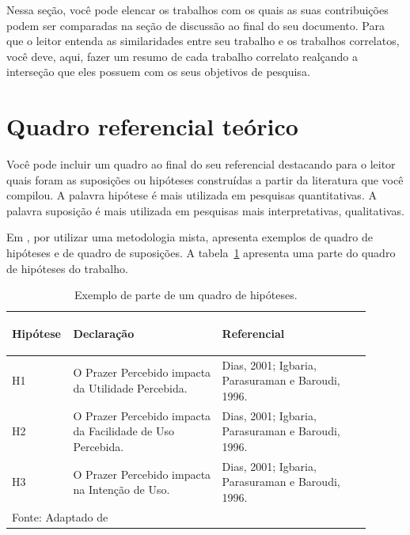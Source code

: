Nessa seção, você pode elencar os trabalhos com os quais as suas contribuições podem ser comparadas na seção de discussão ao final do seu documento.
Para que o leitor entenda as similaridades entre seu trabalho e os trabalhos correlatos, você deve, aqui, fazer um resumo de cada trabalho correlato realçando a interseção que eles possuem com os seus objetivos de pesquisa.

\section{Quadro referencial teórico}

Você pode incluir um quadro ao final do seu referencial destacando para o leitor quais foram as suposições ou hipóteses construídas a partir da literatura que você compilou. A palavra hipótese é mais utilizada em pesquisas quantitativas. A palavra suposição é mais utilizada em pesquisas mais interpretativas, qualitativas.

Em \textcite[37]{DissertacaoElton2015}, por utilizar uma metodologia mista, apresenta exemplos de quadro de hipóteses e de quadro de suposições. A tabela~\ref{tab:quadro_hipoteses} apresenta uma parte do quadro de hipóteses do trabalho.

\begin{table}[H]
	\caption{Exemplo de parte de um quadro de hipóteses.}
	\begin{center}
		\fontsize{10pt}{13pt}\selectfont
		\begin{tabular}{|p{0.1\linewidth}|p{0.4\linewidth}|p{0.4\linewidth}|}
			\hline
			\rowcolor{gray!10}
			\begin{center}
				\textbf{Hipótese}
			\end{center} &
			\begin{center}
				\textbf{Declaração}
			\end{center} &
			\begin{center}
				\textbf{Referencial}
			\end{center} \\
			\hline
			{\centering H1 \par} & O Prazer Percebido impacta da Utilidade Percebida. & Dias, 2001; Igbaria, Parasuraman e Baroudi, 1996. \\
			\hline
			{\centering H2 \par} & O Prazer Percebido impacta da Facilidade de Uso Percebida. & Dias, 2001; Igbaria, Parasuraman e Baroudi, 1996. \\
			\hline
			{\centering H3 \par} & O Prazer Percebido impacta na Intenção de Uso. & Dias, 2001; Igbaria, Parasuraman e Baroudi, 1996. \\
			\hline
			\multicolumn{3}{l}{Fonte: Adaptado de \cite[37]{DissertacaoElton2015}}
		\end{tabular}
		\label{tab:quadro_hipoteses}
	\end{center}
\end{table}


